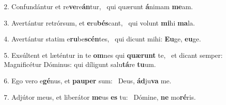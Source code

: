 2. Confundántur et re\textbf{ve}re\textbf{án}tur, \ast\  qui quærunt \textbf{á}nimam \textbf{me}am.\

3. Avertántur retrórsum, et \textbf{e}ru\textbf{bés}cant, \ast\  qui volunt \textbf{mi}hi \textbf{ma}la.\

4. Avertántur statim e\textbf{ru}be\textbf{scén}tes, \ast\  qui dicunt mihi: \textbf{Eu}ge, \textbf{eu}ge.\

5. Exsúltent et læténtur in te \textbf{om}nes qui \textbf{quæ}\textbf{runt} te, \ast\  et dicant semper: Magnificétur Dóminus: qui díligunt salu\textbf{tá}re \textbf{tu}um.\

6. Ego vero e\textbf{gé}nus, et \textbf{pau}\textbf{per} sum: \ast\  Deus, \textbf{ád}ju\textbf{va} me.\

7. Adjútor meus, et liberátor \textbf{me}us \textbf{es} tu: \ast\  Dómine, \textbf{ne} mo\textbf{ré}ris.\

